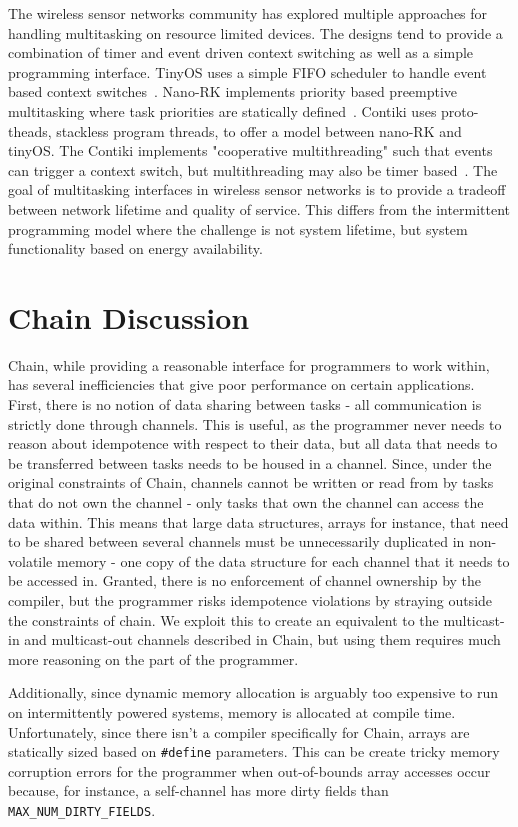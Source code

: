 \documentclass[11pt]{sensys-proc}
\newcommand{\chain}{Chain\xspace}
\begin{document}
The wireless sensor networks community has explored multiple approaches for handling
multitasking on resource limited devices. The designs tend to provide a combination of
timer and event driven context switching as well as a simple programming interface.
TinyOS uses a simple FIFO scheduler to handle event based context switches~\cite{tiny}.
Nano-RK implements priority based preemptive multitasking where task priorities are
statically defined~\cite{nano}. Contiki uses proto-theads, stackless program threads, to
offer a model between nano-RK and tinyOS. The Contiki implements "cooperative
multithreading" such that events can trigger a context switch, but multithreading may also
be timer based~\cite{contiki}. The goal of multitasking interfaces in wireless sensor
networks is to provide a tradeoff between network lifetime and quality of service. This
differs from the intermittent programming model where the challenge is not system
lifetime, but system functionality based on energy availability.

\section{Chain Discussion}
\chain, while providing a reasonable interface for programmers to work within,
has several inefficiencies that give poor performance on certain applications.
First, there is no notion of data sharing between tasks - all communication is
strictly done through channels. This is useful, as the programmer never needs
to reason about idempotence with respect to their data, but all data that needs
to be transferred between tasks needs to be housed in a channel. Since, under
the original constraints of \chain, channels cannot be written or read from by
tasks that do not own the channel - only tasks that own the channel can access
the data within. This means that large data structures, arrays for instance,
that need to be shared between several channels must be unnecessarily
duplicated in non-volatile memory - one copy of the data structure for each
channel that it needs to be accessed in. Granted, there is no enforcement of
channel ownership by the compiler, but the programmer risks idempotence
violations by straying outside the constraints of chain. We exploit this to
create an equivalent to the multicast-in and multicast-out channels described
in \chain, but using them requires much more reasoning on the part of the programmer.


Additionally, since dynamic memory allocation is arguably too expensive to run
on intermittently powered systems, memory is allocated at compile time.
Unfortunately, since there isn't a compiler specifically for \chain, arrays
are statically sized based on \texttt{\#define} parameters. This can be
create tricky memory corruption errors for the programmer when out-of-bounds
array accesses occur because, for instance, a self-channel has more dirty
fields than \texttt{MAX\_NUM\_DIRTY\_FIELDS}.
\end{document}
